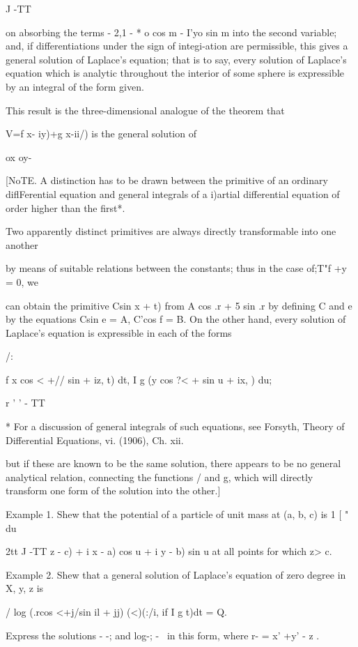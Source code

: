 J -TT

on absorbing the terms - 2,1 - * o cos m - I'yo sin m into the second
variable; and, if differentiations under the sign of integi-ation are
permissible, this gives a general solution of Laplace's equation;
that is to say, every solution of Laplace's equation which is analytic
throughout the interior of some sphere is expressible by an integral
of the form given.

This result is the three-dimensional analogue of the theorem that

V=f x- iy)+g x-ii/) is the general solution of

ox oy-

[NoTE. A distinction has to be drawn between the primitive of an
ordinary diflFerential equation and general integrals of a i)artial
differential equation of order higher than the first*.

Two apparently distinct primitives are always directly transformable
into one another

by means of suitable relations between the constants; thus in the case
of;T"f +y = 0, we

can obtain the primitive Csin x + t) from A cos .r + 5 sin .r by
defining C and e by the equations Csin e = A, C'cos f = B. On the
other hand, every solution of Laplace's equation is expressible in
each of the forms

/:

f x cos < +// sin + iz, t) dt, I g (y cos ?< + sin u + ix, ) du;

r ' ' - TT

* For a discussion of general integrals of such equations, see
Forsyth, Theory of Differential Equations, vi. (1906), Ch. xii.

%
%

but if these are known to be the same solution, there appears to be no
general analytical relation, connecting the functions / and g, which
will directly transform one form of the solution into the other.]

Example 1. Shew that the potential of a particle of unit mass at (a,
b, c) is 1 [ " du

2tt J -TT z - c) + i x - a) cos u + i y - b) sin u at all points for
which z> c.

Example 2. Shew that a general solution of Laplace's equation of zero
degree in X, y, z is

/ log (.rcos <+j/sin il + jj) (<)(:/i, if I g t)dt = Q.

Express the solutions - -; and log-; - \ in this form, where r- = x'
+y' - z .

